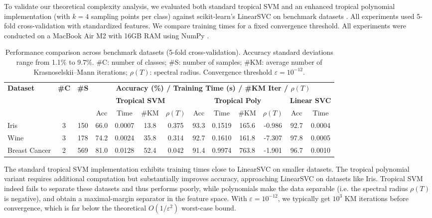 \documentclass{article}
\begin{document}
To validate our theoretical complexity analysis, we evaluated both standard tropical SVM and an enhanced tropical polynomial implementation (with $k=4$ sampling points per class) against scikit-learn's LinearSVC on benchmark datasets \cite{scikit-learn}. All experiments used 5-fold cross-validation with standardized features. We compare training times for a fixed convergence threshold. All experiments were conducted on a MacBook Air M2 with 16GB RAM using NumPy \cite{harris2020array}.

\begin{table}[h]
    \centering
    \footnotesize
    \begin{tabular}{@{}l@{\hskip 4pt}c@{\hskip 4pt}c@{\hskip 8pt}ccc@{\hskip 4pt}c@{\hskip 8pt}cccc@{\hskip 8pt}cc@{}}
    \toprule
    \multirow{3}{*}{\textbf{Dataset}} & \multirow{3}{*}{\textbf{\#C}} & \multirow{3}{*}{\textbf{\#S}} & \multicolumn{10}{c}{\textbf{Accuracy (\%) / Training Time (s) / \#KM Iter / $\rho(T)$}} \\
    \cmidrule(lr){4-13}
    & & & \multicolumn{4}{c}{\textbf{Tropical SVM}} & \multicolumn{4}{c}{\textbf{Tropical Poly}} & \multicolumn{2}{c}{\textbf{Linear SVC}} \\
    \cmidrule(lr){4-7} \cmidrule(lr){8-11} \cmidrule(lr){12-13}
    & & & Acc & Time & \#KM & $\rho(T)$ & Acc & Time & \#KM & $\rho(T)$ & Acc & Time \\
    \midrule
    Iris & 3 & 150 & 66.0 & 0.0007 & 13.8 & 0.375 & 93.3 & 0.1519 & 165.6 & -0.986 & 92.7 & 0.0004 \\
    Wine & 3 & 178 & 74.2 & 0.0024 & 35.8 & 0.314 & 92.7 & 0.1610 & 161.8 & -7.307 & 97.8 & 0.0005 \\
    Breast Cancer & 2 & 569 & 81.0 & 0.0128 & 52.4 & 0.042 & 91.4 & 0.9974 & 763.8 & -1.901 & 96.7 & 0.0010 \\
    \bottomrule
    \end{tabular}
    \vspace{0.5em}
    \caption{Performance comparison across benchmark datasets (5-fold cross-validation). Accuracy standard deviations range from 1.1\% to 9.7\%. \#C: number of classes; \#S: number of samples; \#KM: average number of Krasnoselskii--Mann iterations; $\rho(T)$: spectral radius. Convergence threshold $\varepsilon = 10^{-12}$.}
    \label{tab:benchmark_results}
\end{table}


The standard tropical SVM implementation exhibits training times close to LinearSVC on smaller datasets. The tropical polynomial variant requires additional computation but substantially improves accuracy, approaching LinearSVC on datasets like Iris.
Tropical SVM indeed fails to separate these datasets and thus performs poorly, while polynomials make the data separable (i.e. the spectral radius $\rho(T)$ is negative), and obtain a maximal-margin separator in the feature space.
With $\varepsilon = 10^{-12}$, we typically get $10^3$ KM iterations before convergence, which is far below the theoretical $O(1/\varepsilon^2)$ worst-case bound.
\end{document}
